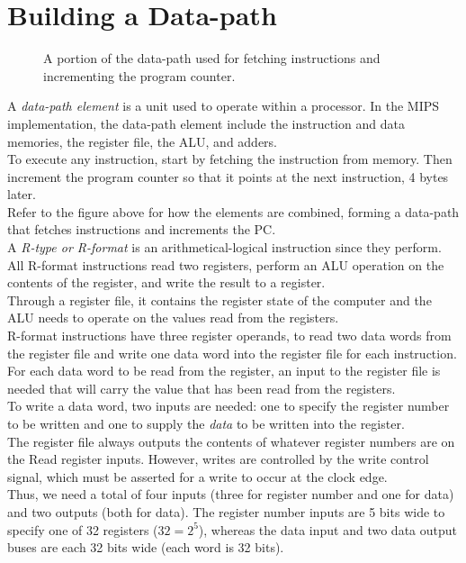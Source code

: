 \documentclass[12pt]{article}
\theoremstyle{definition}
\newcommand{\includePicture}[3]{
  \begin{figure}[!ht]
  \centering
  \scalebox{#1}{\texttt{[image: \#2]}}
  \caption{#3}
  \end{figure}
}
\begin{document}
  \newpage
  \section{Building a Data-path}
  \includePicture{0.7}{pictures/readingFetchingInstruction.png}{A portion of the data-path used for fetching instructions and incrementing the program counter.}
  A \emph{data-path element} is a unit used to operate within a processor.
  In the MIPS implementation, the data-path element include the instruction and data memories, the register file, the ALU, and adders. \\
  To execute any instruction, start by fetching the instruction from memory.
  Then increment the program counter so that it points at the next instruction, 4 bytes later. \\
  Refer to the figure above for how the elements are combined, forming a data-path that fetches instructions and increments the PC. \\

  A \emph{R-type \emph{or} R-format} is an arithmetical-logical instruction since they perform. \\
  All R-format instructions read two registers, perform an ALU operation on the contents of the register, and write the result to a register. \\

  Through a register file, it contains the register state of the computer and the ALU needs to operate on the values read from the registers. \\
  R-format instructions have three register operands, to read two data words from the register file and write one data word into the register file for each instruction. \\
  For each data word to be read from the register, an input to the register file is needed that will carry the value that has been read from the registers. \\
  To write a data word, two inputs are needed: one to specify the register number to be written and one to supply the \emph{data} to be written into the register. \\
  The register file always outputs the contents of whatever register numbers are on the Read register inputs.
  However, writes are controlled by the write control signal, which must be asserted for a write to occur at the clock edge. \\

  Thus, we need a total of four inputs (three for register number and one for data) and two outputs (both for data).
  The register number inputs are 5 bits wide to specify one of 32 registers ($32 = 2^{5}$), whereas the data input and two data output buses are each 32 bits wide (each word is 32 bits).
\end{document}

